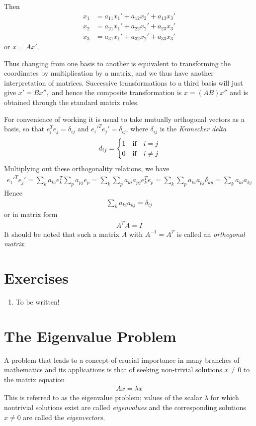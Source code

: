 \documentclass[12pt,a4paper,fleqn]{mycalc}
\begin{document}
	Then
	\begin{align*}
	x_1&=a_{11}x_1'+a_{12}x_2'+a_{13}x_3'\\
	x_2&=a_{21}x_1'+a_{22}x_2'+a_{23}x_3'\\
	x_3&=a_{31}x_1'+a_{32}x_2'+a_{33}x_3'
	\end{align*}
	or \( x=Ax'. \)
	\par
	Thus changing from one basis to another is equivalent to transforming the coordinates by multiplication by a matrix, and we thus have another interpretation of matrices. Successive transformations to a third basis will just give \( x' = Bx'', \) and hence the composite transformation is \( x = (AB)x'' \) and is obtained through the standard matrix rules.
	\par
	For convenience of working it is usual to take mutually orthogonal vectors as a basis, so that \( e_i^{T}e_j=\delta_{ij} \) and \( e_i'^{T}e_j'=\delta_{ij} \), where \(\delta_{ij}\) is the \emph{Kronecker delta}
	\begin{align*}
	d_{ij}=\begin{cases}
	1 &\textnormal{if}\quad i=j\\
	0 &\textnormal{if}\quad i\neq j
	\end{cases}
	\end{align*}
	Multiplying out these orthogonality relations, we have
	\begin{align*}
	e_1'^{T}e_j'=\sum_{k}a_{ki}e_k^{T}\sum_{p}a_{pj}e_p
	=\sum_{k}\sum_{p}a_{ki}a_{pj}e_k^{T}e_p
	=\sum_{k}\sum_{p}a_{ki}a_{pj}\delta_{kp}
	=\sum_{k}a_{ki}a_{kj}
	\end{align*}
	Hence
	\begin{align*}
	\sum_{k}a_{ki}a_{kj}=\delta_{ij}
	\end{align*}
	or in matrix form
	\begin{align*}
	A^{T}A=I
	\end{align*}
	It should be noted that such a matrix \( A \) with \( A^{-1} = A^{T} \) is called an \emph{orthogonal matrix.}
	\section*{Exercises}
	\begin{enumerate}
		\item To be written!
	\end{enumerate}
	\section{The Eigenvalue Problem}
	A problem that leads to a concept of crucial importance in many branches of mathematics and its applications is that of seeking non-trivial solutions \( x \neq 0 \) to the matrix equation
	\begin{align*}
	Ax = \lambda x
	\end{align*}
	This is referred to as the eigenvalue problem; values of the scalar \( \lambda \) for which nontrivial solutions exist are called \emph{eigenvalues} and the corresponding solutions \( x \neq 0 \) are
	called the \emph{eigenvectors.}
\end{document}
